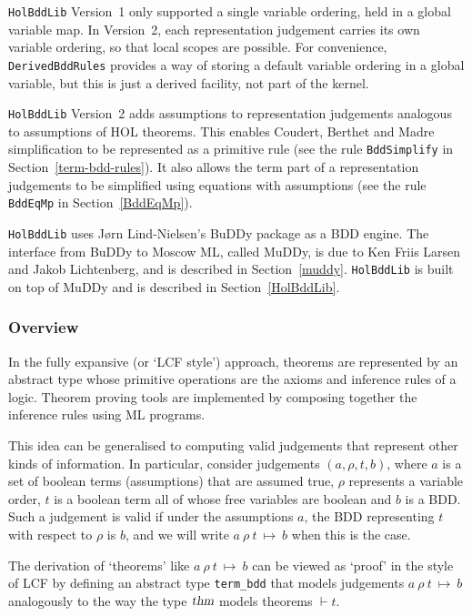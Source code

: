 \documentclass[12pt,fleqn]{book}
\renewcommand{\t}[1]{\mbox{\tt #1}}
\newcommand{\termbdd}[4]{\mbox{$#1~#2~#3~\mapsto~#4$}}
\newcommand\termbddty{\texttt{term\_bdd}{}}
\newcommand{\Buddy}{BuDDy{}}
\newcommand{\Muddy}{MuDDy{}}
\begin{document}
{\tt{HolBddLib}} Version~1 only supported a single variable
ordering, held in a global variable map. In Version~2, each
representation judgement carries its own variable ordering, so that local
scopes are possible. For convenience, {\tt{DerivedBddRules}}
provides a way of storing a default variable ordering in a global
variable, but this is just a derived facility, not part of the kernel.

{\tt{HolBddLib}} Version~2 adds assumptions to representation judgements
analogous to assumptions of HOL theorems. This enables
Coudert, Berthet and Madre simplification to be represented as a primitive
rule (see the rule \t{BddSimplify} in Section~\ref{term-bdd-rules}). It also allows the term part
of a representation judgements to be simplified using equations with assumptions
(see the rule \t{BddEqMp} in Section~\ref{BddEqMp}).

{\tt HolBddLib} uses J{\o}rn Lind-Nielsen's \Buddy{} package as a BDD
engine. The interface from \Buddy{} to Moscow ML, called \Muddy, is
due to Ken Friis Larsen and Jakob Lichtenberg, and is described in Section~\ref{muddy}.
{\tt HolBddLib} is built on top of \Muddy{} and
is described in Section~\ref{HolBddLib}.

\subsubsection{Overview}

In the fully expansive (or `LCF style') approach, theorems are represented by an abstract type
whose primitive operations are the axioms and inference rules of a
logic.  Theorem proving tools are implemented by composing together
the inference rules using ML programs.

This idea can be generalised to computing valid judgements that
represent other kinds of information. In particular, consider
judgements $(a,\rho,t,b)$, where $a$ is a set of boolean terms
(assumptions) that are assumed true, $\rho$ represents a variable
order, $t$ is a boolean term all of whose free variables are boolean
and $b$ is a BDD. Such a judgement is valid if under the assumptions
$a$, the BDD representing $t$ with respect to $\rho$ is $b$, and we
will write \termbdd{a}{\rho}{t}{b} when this is the case.

The derivation of `theorems' like \termbdd{a}{\rho}{t}{b} can be viewed
as `proof' in the style of LCF by defining an abstract type \termbddty{}
that models
judgements $\termbdd{a}{\rho}{t}{b}$ analogously
to the way the type $\textsl{thm}$ models theorems $\vdash t$.
\end{document}
